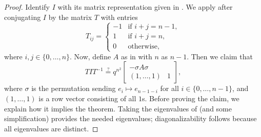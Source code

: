 \begin{proof}
    Identify $I$ with its matrix representation given in . We apply  after conjugating $I$ by the matrix $T$ with entries
    \[T_{ij}=\begin{cases}
        -1 & \text{if }i+j=n-1, \\
        1 & \text{if }i+j=n, \\
        0 & \text{otherwise},
    \end{cases}\]
    where $i,j\in\{0,\ldots,n\}$. Now, define $A$ as in  with $n$ as $n-1$. Then we claim that
    \begin{equation}
        TIT^{-1} \stackrel?= q^{n^2}\begin{bmatrix}
            -\sigma A\sigma \\
            (1,\ldots,1) & 1
        \end{bmatrix}, \label{eq:conj-intertwining-gl}
    \end{equation}
    where $\sigma$ is the permutation sending $e_i\mapsto e_{n-1-i}$ for all $i\in\{0,\ldots,n-1\}$, and $(1,\ldots,1)$ is a row vector consisting of all $1$s. Before proving the claim, we explain how it implies the theorem. Taking the eigenvalues of  (and some simplification) provides the needed eigenvalues; diagonalizability follows because all eigenvalues are distinct.


\end{proof}
